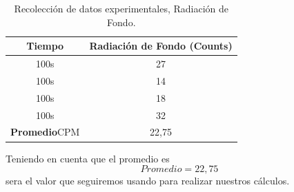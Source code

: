\documentclass{article}									%
\begin{document}
\begin{table}[H]
\centering
\begin{tabular}{|c|c|}
\hline
Tiempo            & Radiación de Fondo (Counts) \\ \hline
100s              & 27                         \\ \hline
100s              & 14                         \\ \hline
100s              & 18                         \\ \hline
100s              & 32                         \\ \hline
\textbf{Promedio}CPM & 22,75                      \\ \hline
\end{tabular}
\caption{Recolección de datos experimentales, Radiación de Fondo.}
\label{my-label}
\end{table}
Teniendo en cuenta que el promedio es $$Promedio = 22,75$$
sera el valor que seguiremos usando para realizar nuestros cálculos.
$$$$
$$$$
\end{document}
